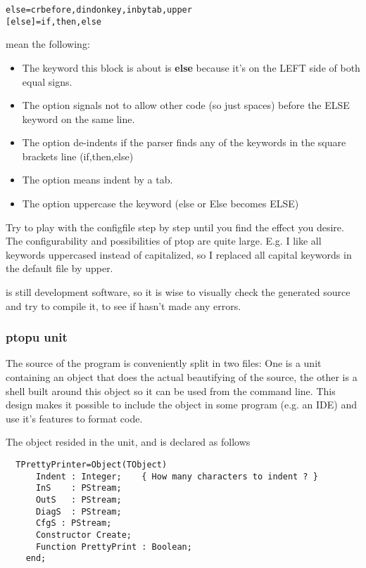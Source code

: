 \documentclass{report}
\begin{document}
\begin{verbatim}
else=crbefore,dindonkey,inbytab,upper
[else]=if,then,else
\end{verbatim}

mean the following:

\begin{itemize}
\item The keyword this block is about is \textbf{else} because it's on the LEFT side
of both equal signs.
\item The option  signals not to allow other code (so just spaces)
before the ELSE keyword on the same line.
\item The option  de-indents if the parser finds any of the keywords
 in the square brackets line (if,then,else)
\item The option  means indent by a tab.
\item The option  uppercase the keyword (else or Else becomes ELSE)
\end{itemize}

Try to play with the configfile step by step until you find the effect you desire.
The configurability and possibilities of ptop are quite large. E.g. I like all
keywords uppercased instead of capitalized, so I replaced all capital keywords in
the default file by upper.

 is still development software, so it is wise to visually check the generated
source and try to compile it, to see if  hasn't made any errors.

\subsubsection{ptopu unit}

The source of the  program is conveniently split in two files:
One is a unit containing an object that does the actual beautifying of the
source, the other is a shell built around this object so it can be used
from the command line. This design makes it possible to include the object
in some program (e.g. an IDE) and use it's features to format code.

The object resided in the  unit, and is declared as follows
\begin{verbatim}
  TPrettyPrinter=Object(TObject)
      Indent : Integer;    { How many characters to indent ? }
      InS    : PStream;
      OutS   : PStream;
      DiagS  : PStream;
      CfgS : PStream;
      Constructor Create;
      Function PrettyPrint : Boolean;
    end;
\end{verbatim}
\end{document}
